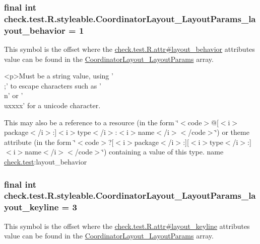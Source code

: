\subsubsection[{Coordinator\+Layout\+\_\+\+Layout\+Params\+\_\+layout\+\_\+behavior}]{\setlength{\rightskip}{0pt plus 5cm}final int check.\+test.\+R.\+styleable.\+Coordinator\+Layout\+\_\+\+Layout\+Params\+\_\+layout\+\_\+behavior = 1\hspace{0.3cm}{\ttfamily [static]}}\label{classcheck_1_1test_1_1_r_1_1styleable_ae9db473c28ded0bb6dcf42e3c26445a1}
This symbol is the offset where the \hyperlink{classcheck_1_1test_1_1_r_1_1attr_aa93dbcd477d2bd01b579801fd1bff846}{check.\+test.\+R.\+attr\#layout\+\_\+behavior} attribute\textquotesingle{}s value can be found in the \hyperlink{classcheck_1_1test_1_1_r_1_1styleable_a9873c4709aad91a176af799873edc422}{Coordinator\+Layout\+\_\+\+Layout\+Params} array.

\begin{DoxyVerb}      <p>Must be a string value, using '\\;' to escape characters such as '\\n' or '\\uxxxx' for a unicode character.
\end{DoxyVerb}
 

This may also be a reference to a resource (in the form \char`\"{}$<$code$>$@\mbox{[}$<$i$>$package$<$/i$>$\+:\mbox{]}$<$i$>$type$<$/i$>$\+:$<$i$>$name$<$/i$>$$<$/code$>$\char`\"{}) or theme attribute (in the form \char`\"{}$<$code$>$?\mbox{[}$<$i$>$package$<$/i$>$\+:\mbox{]}\mbox{[}$<$i$>$type$<$/i$>$\+:\mbox{]}$<$i$>$name$<$/i$>$$<$/code$>$\char`\"{}) containing a value of this type.  name \hyperlink{namespacecheck_1_1test}{check.\+test}\+:layout\+\_\+behavior \hypertarget{classcheck_1_1test_1_1_r_1_1styleable_a4dd7ccd864a6f3ecf1b6734fb54a58ff}{}
\subsubsection[{Coordinator\+Layout\+\_\+\+Layout\+Params\+\_\+layout\+\_\+keyline}]{\setlength{\rightskip}{0pt plus 5cm}final int check.\+test.\+R.\+styleable.\+Coordinator\+Layout\+\_\+\+Layout\+Params\+\_\+layout\+\_\+keyline = 3\hspace{0.3cm}{\ttfamily [static]}}\label{classcheck_1_1test_1_1_r_1_1styleable_a4dd7ccd864a6f3ecf1b6734fb54a58ff}
This symbol is the offset where the \hyperlink{classcheck_1_1test_1_1_r_1_1attr_a4471bf945a7ff92386e6b03e2f974b7d}{check.\+test.\+R.\+attr\#layout\+\_\+keyline} attribute\textquotesingle{}s value can be found in the \hyperlink{classcheck_1_1test_1_1_r_1_1styleable_a9873c4709aad91a176af799873edc422}{Coordinator\+Layout\+\_\+\+Layout\+Params} array.

